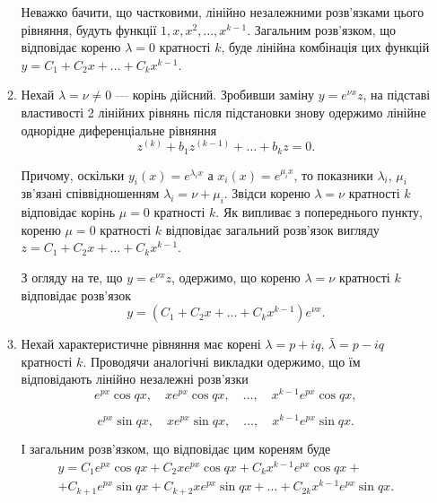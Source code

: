 \begin{enumerate}
\begin{enumerate}
        Неважко бачити, що частковими, лінійно незалежними роз\-в'я\-з\-ка\-ми цього рівняння, будуть функції $1, x, x^2, \ldots, x^{k-1}$. Загальним роз\-в'я\-з\-ком, що відповідає кореню $\lambda=0$ кратності $k$, буде лінійна комбінація цих функцій $y = C_1 + C_2 x + \ldots + C_k x^{k - 1}$.
        
        \item Нехай $\lambda = \nu \ne 0$ --- корінь дійсний. Зробивши заміну $y = e^{\nu x} z$, на підставі властивості 2 лінійних рівнянь після підстановки знову одержимо лінійне однорідне диференціальне рівняння 
        \begin{equation*}
        	z^{(k)} + b_1 z^{(k-1)} + \ldots + b_k z = 0.
        \end{equation*}
        
        Причому, оскільки $y_i(x) = e^{\lambda_i x}$ а $x_i(x) = e^{\mu_i x}$, то показники $\lambda_i$, $\mu_i$ зв'язані співвідношенням $\lambda_i = \nu + \mu_i$. Звідси кореню $\lambda = \nu$ кратності $k$ відповідає корінь $\mu=0$ кратності $k$. Як випливає з попереднього пункту, кореню $\mu=0$ кратності $k$ відповідає загальний розв'язок вигляду $z = C_1 + C_2 x + \ldots + C_k x^{k - 1}$. \parvskip
        
        З огляду на те, що $y = e^{\nu x} z$, одержимо, що кореню $\lambda=\nu$ кратності $k$ відповідає розв'язок
        \begin{equation*}
        	y = \left(C_1 + C_2 x + \ldots + C_k x^{k - 1} \right) e^{\nu x}.
        \end{equation*}
        
        \item Нехай характеристичне рівняння має корені $\lambda=p+iq$, $\bar\lambda=p-iq$ кратності $k$. Проводячи аналогічні викладки одержимо, що їм відповідають лінійно незалежні розв'язки
        \begin{equation*}
        	e^{px} \cos qx, \quad x e^{px} \cos qx, \quad \ldots, \quad x^{k-1} e^{px} \cos qx,
        \end{equation*}
        
        \begin{equation*}
        	e^{px} \sin qx, \quad x e^{px} \sin qx, \quad \ldots, \quad x^{k-1} e^{px} \sin qx.
        \end{equation*}
        
        І загальним розв'язком, що відповідає цим кореням буде
        \begin{multline*}
        	y = C_1 e^{px} \cos qx + C_2 x e^{px} \cos qx + C_k x^{k-1} e^{px} \cos qx + \\ + C_{k+1} e^{px} \sin qx + C_{k+2} x e^{px} \sin qx + \ldots + C_{2k} x^{k-1} e^{px} \sin qx.
        \end{multline*}
    \end{enumerate}
\end{enumerate}
